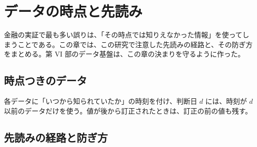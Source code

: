 \chapter{データの時点と先読み}\label{ch:pit}

金融の実証で最も多い誤りは、「その時点では知りえなかった情報」を使ってしまうことである。この章では、この研究で注意した先読みの経路と、その防ぎ方をまとめる。第 VI 部のデータ基盤は、この章の決まりを守るように作った。

\section{時点つきのデータ}

\begin{defbox}
各データに「いつから知られていたか」の時刻を付け、判断日 $d$ には、時刻が $d$ 以前のデータだけを使う。値が後から訂正されたときは、訂正の前の値も残す。
\end{defbox}

\section{先読みの経路と防ぎ方}

